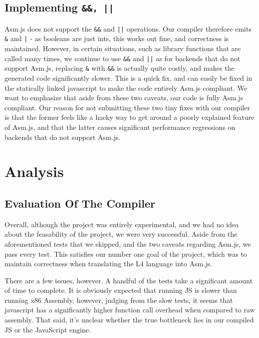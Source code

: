 \documentclass[twoside]{article}
\begin{document}
\begin{multicols}{2}
  \subsection {Implementing \texttt{\&\&, ||}}
  Asm.js does not support the \texttt{\&\&} and \texttt{||} operations. Our compiler
  therefore emits \texttt{\&} and \texttt{|} - as booleans are just ints, this 
  works out fine, and correctness is maintained. However, in certain situations, such
  as library functions that are called many times, we continue to use \texttt{\&\&} and
  \texttt{||} as for backends that do not support Asm.js, replacing \texttt{\&} with 
  \texttt{\&\&} is actually quite costly, and makes the generated code significantly slower. 
  This is a quick fix, and can easily be fixed in the statically linked javascript to 
  make the code entirely Asm.js compliant. 
We want to emphasize that aside from these two caveats, our code is fully Asm.js 
compliant. Our reason for not submitting these two tiny fixes with our compiler is
that the former feels like a hacky way to get around a poorly explained feature of
Asm.js, and that the latter causes significant performance regressions on backends
that do not support Asm.js. 


\section{Analysis}

\subsection{Evaluation Of The Compiler}

Overall, although the project was entirely experimental, and we had no idea about
the feasability of the project, we were very successful. Aside from the aforementioned
tests that we skipped, and the two caveats regarding Asm.js, we pass every test. 
This satisfies our number one goal of the project, which was to maintain correctness
when translating the L4 language into Asm.js. 

There are a few issues, however. A handful of the tests take a significant amount of time to
complete. It is obviously expected that running JS is slower than running x86 Assembly, 
however, judging from the slow tests, it seems that javascript has a significantly higher
function call overhead when compared to raw assembly. That said, it's unclear whether 
the true bottleneck lies in our compiled JS or the JavaScript engine.


\end{multicols}
\end{document}
